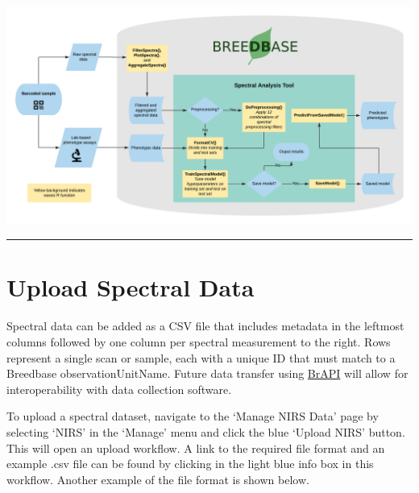 \documentclass[
  12pt,
]{book}
\begin{document}
\begin{center}\includegraphics[width=0.95\linewidth]{assets/images/waves_breedbase_schema} \end{center}

\begin{center}\rule{0.5\linewidth}{0.5pt}\end{center}

\hypertarget{upload-spectral-data}{%
\section{Upload Spectral Data}\label{upload-spectral-data}}

Spectral data can be added as a CSV file that includes metadata in the leftmost columns followed by one column per spectral measurement to the right. Rows represent a single scan or sample, each with a unique ID that must match to a Breedbase observationUnitName. Future data transfer using \href{https://brapi.org}{BrAPI} will allow for interoperability with data collection software.

To upload a spectral dataset, navigate to the `Manage NIRS Data' page by selecting `NIRS' in the `Manage' menu and click the blue `Upload NIRS' button. This will open an upload workflow. A link to the required file format and an example .csv file can be found by clicking in the light blue info box in this workflow. Another example of the file format is shown below.
\end{document}
